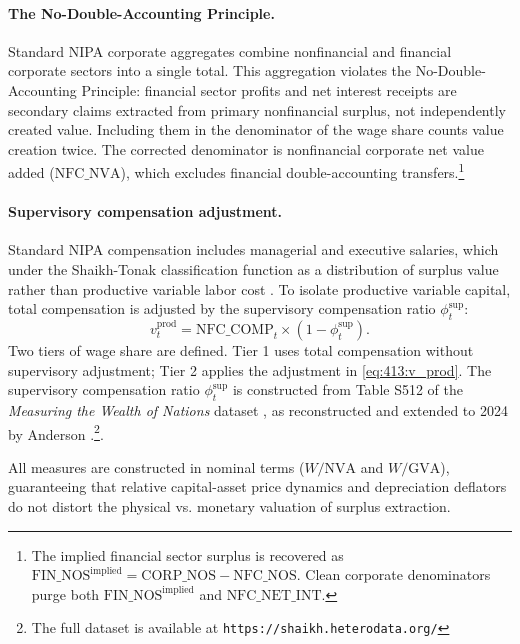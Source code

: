 \paragraph{The No-Double-Accounting Principle.}
Standard NIPA corporate aggregates combine nonfinancial and
financial corporate sectors into a single total. This aggregation
violates the No-Double-Accounting Principle: financial sector
profits and net interest receipts are secondary claims extracted
from primary nonfinancial surplus, not independently created value.
Including them in the denominator of the wage share counts value
creation twice. The corrected denominator is nonfinancial corporate
net value added ($\text{NFC\_NVA}$), which excludes financial
double-accounting transfers.\footnote{The implied financial sector
	surplus is recovered as $\text{FIN\_NOS}^{\text{implied}} =
	\text{CORP\_NOS} - \text{NFC\_NOS}$. Clean corporate denominators
	purge both $\text{FIN\_NOS}^{\text{implied}}$ and
	$\text{NFC\_NET\_INT}$.}

\paragraph{Supervisory compensation adjustment.}
Standard NIPA compensation includes managerial and executive
salaries, which under the Shaikh-Tonak classification function as a
distribution of surplus value rather than productive variable labor
cost \citep{ShaikhTonak1994}. To isolate productive variable
capital, total compensation is adjusted by the supervisory
compensation ratio $\phi^{\text{sup}}_t$:
\begin{equation}
	v^{\text{prod}}_t =
	\text{NFC\_COMP}_t \times
	\left(1 - \phi^{\text{sup}}_t\right).
	\label{eq:413:v_prod}
\end{equation}
Two tiers of wage share are defined. Tier 1 uses total compensation
without supervisory adjustment; Tier 2 applies the adjustment in
\eqref{eq:413:v_prod}. The supervisory compensation ratio $\phi^{\text{sup}}_t$ is constructed from Table S512 of the \textit{Measuring the Wealth of Nations} dataset \citep{ShaikhTonak1994}, as reconstructed and extended to 2024 by Anderson \citep{ShaikhData2024}.\footnote{The full dataset is available at \texttt{https://shaikh.heterodata.org/}}. 

All measures are constructed in nominal terms ($W / \text{NVA}$ and $W / \text{GVA}$), guaranteeing that relative capital-asset price dynamics and depreciation deflators do not distort the physical vs. monetary valuation of surplus extraction.


